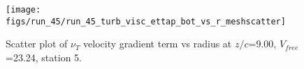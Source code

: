 \begin{figure}[H]
\centering
\texttt{[image: figs/run\_45/run\_45\_turb\_visc\_ettap\_bot\_vs\_r\_meshscatter]}
\caption{Scatter plot of $\nu_T$ velocity gradient term vs radius at $z/c$=9.00, $V_{free}$=23.24, station 5.}
\label{fig:run_45_turb_visc_ettap_bot_vs_r_meshscatter}
\end{figure}


